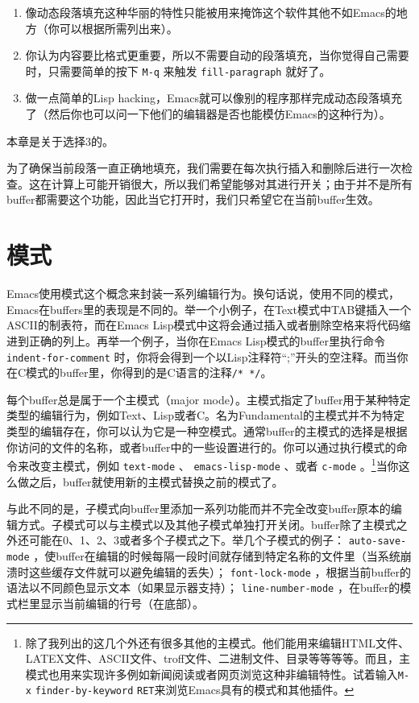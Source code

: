 \begin{enumerate}
  \item 像动态段落填充这种华丽的特性只能被用来掩饰这个软件其他不如Emacs的地方（你可以根据所需列出来）。
  \item 你认为内容要比格式更重要，所以不需要自动的段落填充，当你觉得自己需要时，只需要简单的按下 \verb|M-q| 来触发 \texttt{fill-paragraph} 就好了。
  \item 做一点简单的Lisp hacking，Emacs就可以像别的程序那样完成动态段落填充了（然后你也可以问一下他们的编辑器是否也能模仿Emacs的这种行为）。
\end{enumerate}

本章是关于选择3的。

为了确保当前段落一直正确地填充，我们需要在每次执行插入和删除后进行一次检查。这在计算上可能开销很大，所以我们希望能够对其进行开关；由于并不是所有buffer都需要这个功能，因此当它打开时，我们只希望它在当前buffer生效。

\section{模式}
\label{section:07-Modes}

Emacs使用模式这个概念来封装一系列编辑行为。换句话说，使用不同的模式，Emacs在buffers里的表现是不同的。举一个小例子，在Text模式中TAB键插入一个ASCII的制表符，而在Emacs Lisp模式中这将会通过插入或者删除空格来将代码缩进到正确的列上。再举一个例子，当你在Emacs Lisp模式的buffer里执行命令 \texttt{indent-for-comment} 时，你将会得到一个以Lisp注释符“;”开头的空注释。而当你在C模式的buffer里，你得到的是C语言的注释\texttt{/* */}。

每个buffer总是属于一个主模式（major mode）。主模式指定了buffer用于某种特定类型的编辑行为，例如Text、Lisp或者C。名为Fundamental的主模式并不为特定类型的编辑存在，你可以认为它是一种空模式。通常buffer的主模式的选择是根据你访问的文件的名称，或者buffer中的一些设置进行的。你可以通过执行模式的命令来改变主模式，例如 \texttt{text-mode} 、 \texttt{emacs-lisp-mode} 、或者 \texttt{c-mode} 。\footnote{除了我列出的这几个外还有很多其他的主模式。他们能用来编辑HTML文件、LATEX文件、ASCII文件、troff文件、二进制文件、目录等等等等。而且，主模式也用来实现许多例如新闻阅读或者网页浏览这种非编辑特性。试着输入\texttt{M-x} \texttt{finder-by-keyword} \texttt{RET}来浏览Emacs具有的模式和其他插件。}当你这么做之后，buffer就使用新的主模式替换之前的模式了。

与此不同的是，子模式向buffer里添加一系列功能而并不完全改变buffer原本的编辑方式。子模式可以与主模式以及其他子模式单独打开关闭。buffer除了主模式之外还可能在0、1、2、3或者多个子模式之下。举几个子模式的例子： \texttt{auto-save-mode} ，使buffer在编辑的时候每隔一段时间就存储到特定名称的文件里（当系统崩溃时这些缓存文件就可以避免编辑的丢失）； \texttt{font-lock-mode} ，根据当前buffer的语法以不同颜色显示文本（如果显示器支持）； \texttt{line-number-mode} ，在buffer的模式栏里显示当前编辑的行号（在底部）。

